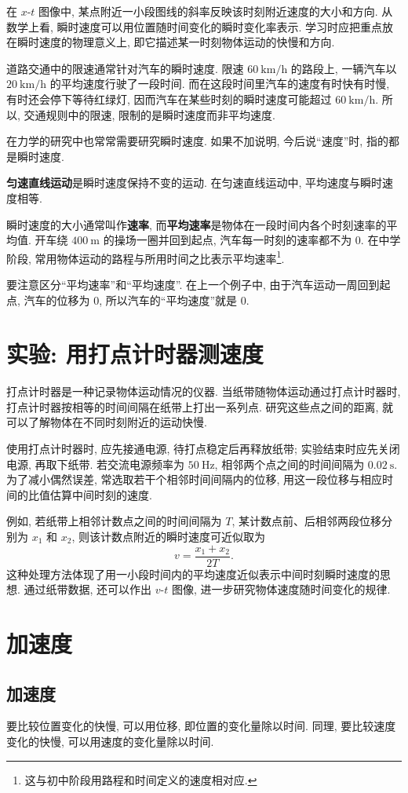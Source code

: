 \documentclass[UTF8,openany,fontset=fandol]{ctexbook}
\theoremstyle{chinesetextbook}
\newcommand{\unit}[1]{\ \mathrm{#1}}
\begin{document}
在 $x$-$t$ 图像中, 某点附近一小段图线的斜率反映该时刻附近速度的大小和方向. 从数学上看, 瞬时速度可以用位置随时间变化的瞬时变化率表示. 学习时应把重点放在瞬时速度的物理意义上, 即它描述某一时刻物体运动的快慢和方向.

道路交通中的限速通常针对汽车的瞬时速度. 限速 $60\unit{km/h}$ 的路段上, 一辆汽车以 $20\unit{km/h}$ 的平均速度行驶了一段时间. 而在这段时间里汽车的速度有时快有时慢, 有时还会停下等待红绿灯, 因而汽车在某些时刻的瞬时速度可能超过 $60\unit{km/h}$. 所以, 交通规则中的限速, 限制的是瞬时速度而非平均速度.

在力学的研究中也常常需要研究瞬时速度. 如果不加说明, 今后说“速度”时, 指的都是瞬时速度.

\textbf{匀速直线运动}是瞬时速度保持不变的运动. 在匀速直线运动中, 平均速度与瞬时速度相等.

瞬时速度的大小通常叫作\textbf{速率}, 而\textbf{平均速率}是物体在一段时间内各个时刻速率的平均值. 开车绕 $400\unit{m}$ 的操场一圈并回到起点, 汽车每一时刻的速率都不为 0. 在中学阶段, 常用物体运动的路程与所用时间之比表示平均速率\footnote{这与初中阶段用路程和时间定义的速度相对应.}.

要注意区分“平均速率”和“平均速度”. 在上一个例子中, 由于汽车运动一周回到起点, 汽车的位移为 0, 所以汽车的“平均速度”就是 0.
\section{实验: 用打点计时器测速度}
打点计时器是一种记录物体运动情况的仪器. 当纸带随物体运动通过打点计时器时, 打点计时器按相等的时间间隔在纸带上打出一系列点. 研究这些点之间的距离, 就可以了解物体在不同时刻附近的运动快慢.

使用打点计时器时, 应先接通电源, 待打点稳定后再释放纸带; 实验结束时应先关闭电源, 再取下纸带. 若交流电源频率为 $50\unit{Hz}$, 相邻两个点之间的时间间隔为 $0.02\unit{s}$. 为了减小偶然误差, 常选取若干个相邻时间间隔内的位移, 用这一段位移与相应时间的比值估算中间时刻的速度.

例如, 若纸带上相邻计数点之间的时间间隔为 $T$, 某计数点前、后相邻两段位移分别为 $x_1$ 和 $x_2$, 则该计数点附近的瞬时速度可近似取为
\[
v=\frac{x_1+x_2}{2T}.
\]
这种处理方法体现了用一小段时间内的平均速度近似表示中间时刻瞬时速度的思想. 通过纸带数据, 还可以作出 $v$-$t$ 图像, 进一步研究物体速度随时间变化的规律.
\section{加速度}
\subsection{加速度}
要比较位置变化的快慢, 可以用位移, 即位置的变化量除以时间. 同理, 要比较速度变化的快慢, 可以用速度的变化量除以时间.
\end{document}
